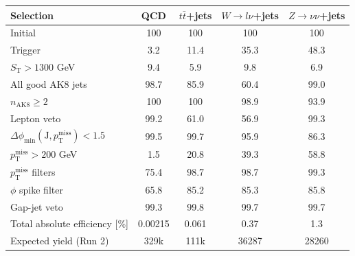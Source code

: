 {\footnotesize\setlength{\tabcolsep}{1.45pt}\renewcommand{\arraystretch}{0.82}%
\begin{tabular}{@{}lcccc@{}}
\hline
Selection & QCD & $t\bar{t}$+jets & $W\to l\nu$+jets & $Z\to\nu\nu$+jets \\
\hline
Initial & 100 & 100 & 100 & 100 \\
Trigger & 3.2 & 11.4 & 35.3 & 48.3 \\
$S_{\mathrm{T}}>1300$ GeV & 9.4 & 5.9 & 9.8 & 6.9 \\
All good AK8 jets & 98.7 & 85.9 & 60.4 & 99.0 \\
$n_{\mathrm{AK8}}\geq 2$ & 100 & 100 & 98.9 & 93.9 \\
Lepton veto & 99.2 & 61.0 & 56.9 & 99.3 \\
$\Delta\phi_{\min}(\mathrm{J},p_{\mathrm{T}}^{\mathrm{miss}})<1.5$ & 99.5 & 99.7 & 95.9 & 86.3 \\
$p_{\mathrm{T}}^{\mathrm{miss}}>200$ GeV & 1.5 & 20.8 & 39.3 & 58.8 \\
$p_{\mathrm{T}}^{\mathrm{miss}}$ filters & 75.4 & 98.7 & 98.7 & 99.3 \\
$\phi$ spike filter & 65.8 & 85.2 & 85.3 & 85.8 \\
Gap-jet veto & 99.3 & 99.8 & 99.7 & 99.7 \\
\hline
Total absolute efficiency [\%] & 0.00215 & 0.061 & 0.37 & 1.3 \\
\hline
Expected yield (Run 2) & 329k & 111k & 36287 & 28260 \\
\hline
\end{tabular}%
}
